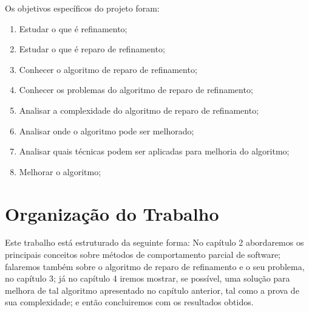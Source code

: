 
Os objetivos específicos do projeto foram:

\begin{enumerate}
\item Estudar o que é refinamento;
\item Estudar o que é reparo de refinamento;
\item Conhecer o algoritmo de reparo de refinamento;
\item Conhecer os problemas do algoritmo de reparo de refinamento;
\item Analisar a complexidade do algoritmo de reparo de refinamento;
\item Analisar onde o algoritmo pode ser melhorado;
\item Analisar quais técnicas podem ser aplicadas para melhoria do algoritmo;
\item Melhorar o algoritmo;
\end{enumerate}

\section{Organização do Trabalho}

Este trabalho está estruturado da seguinte forma: No capítulo 2 abordaremos os principais conceitos sobre métodos de comportamento parcial de software; falaremos também sobre o algoritmo de reparo de refinamento e o seu problema, no capítulo 3; já no capítulo 4 iremos mostrar, se possível, uma solução para melhora de tal algoritmo apresentado no capítulo anterior, tal como a prova de sua complexidade; e então concluiremos com os resultados obtidos.

